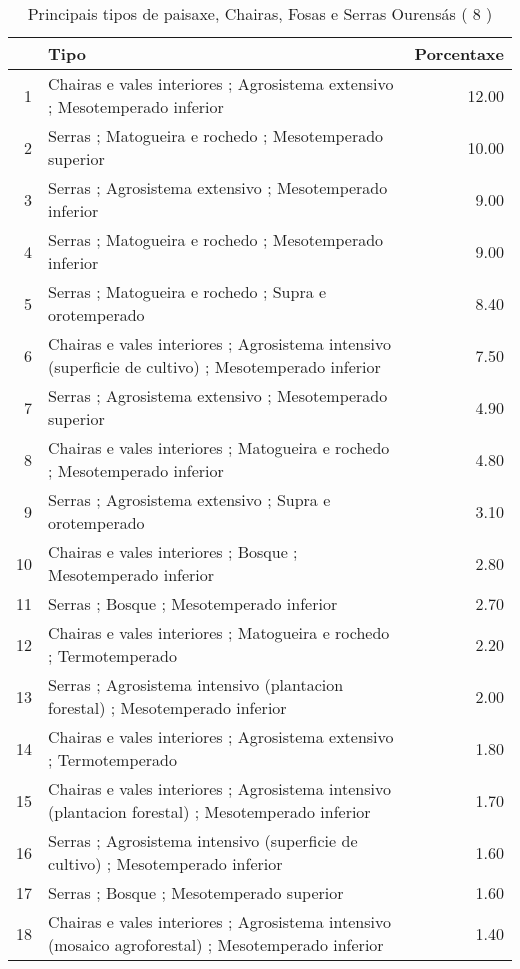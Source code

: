 \begin{table}[p]
\centering
\caption{Principais tipos de paisaxe,  Chairas, Fosas e Serras Ourensás ( 8 )} 
\label{Tipos 8}
\begin{tabular}{rlr}
  \hline
 & Tipo & Porcentaxe \\ 
  \hline
1 & Chairas e vales interiores ; Agrosistema extensivo ; Mesotemperado inferior & 12.00 \\ 
  2 & Serras ; Matogueira e rochedo ; Mesotemperado superior & 10.00 \\ 
  3 & Serras ; Agrosistema extensivo ; Mesotemperado inferior & 9.00 \\ 
  4 & Serras ; Matogueira e rochedo ; Mesotemperado inferior & 9.00 \\ 
  5 & Serras ; Matogueira e rochedo ; Supra e orotemperado & 8.40 \\ 
  6 & Chairas e vales interiores ; Agrosistema intensivo (superficie de cultivo) ; Mesotemperado inferior & 7.50 \\ 
  7 & Serras ; Agrosistema extensivo ; Mesotemperado superior & 4.90 \\ 
  8 & Chairas e vales interiores ; Matogueira e rochedo ; Mesotemperado inferior & 4.80 \\ 
  9 & Serras ; Agrosistema extensivo ; Supra e orotemperado & 3.10 \\ 
  10 & Chairas e vales interiores ; Bosque ; Mesotemperado inferior & 2.80 \\ 
  11 & Serras ; Bosque ; Mesotemperado inferior & 2.70 \\ 
  12 & Chairas e vales interiores ; Matogueira e rochedo ; Termotemperado & 2.20 \\ 
  13 & Serras ; Agrosistema intensivo (plantacion forestal) ; Mesotemperado inferior & 2.00 \\ 
  14 & Chairas e vales interiores ; Agrosistema extensivo ; Termotemperado & 1.80 \\ 
  15 & Chairas e vales interiores ; Agrosistema intensivo (plantacion forestal) ; Mesotemperado inferior & 1.70 \\ 
  16 & Serras ; Agrosistema intensivo (superficie de cultivo) ; Mesotemperado inferior & 1.60 \\ 
  17 & Serras ; Bosque ; Mesotemperado superior & 1.60 \\ 
  18 & Chairas e vales interiores ; Agrosistema intensivo (mosaico agroforestal) ; Mesotemperado inferior & 1.40 \\ 

\end{tabular}
\end{table}
